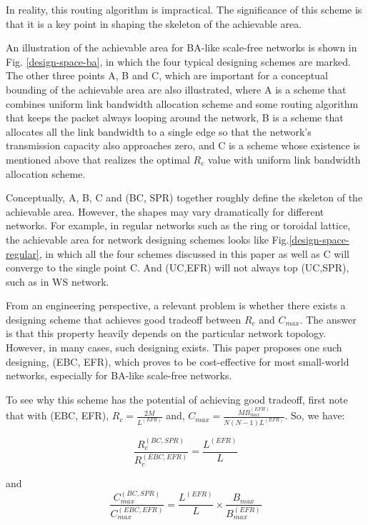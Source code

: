 \documentclass[journal]{IEEEtran}
\begin{document}
{In reality, this routing algorithm is impractical. The significance
of this scheme is that it is a key point in shaping the skeleton of
the achievable area.

An illustration of the achievable area  for BA-like scale-free
networks is shown in Fig. \ref{design-space-ba}, in which the four
typical designing schemes are marked. The other three points A, B
and C, which are important for a conceptual bounding of the
achievable area are also illustrated, where A is a scheme that
combines uniform link bandwidth allocation scheme and some routing
algorithm that keeps the packet always looping around the network, B
is a scheme that allocates all the link bandwidth to a single edge
so that the network's transmission capacity also approaches zero,
and C is a scheme whose existence is mentioned above that realizes
the optimal $R_c$ value with uniform link bandwidth allocation
scheme.

Conceptually, A, B, C and (BC, SPR) together roughly define the
skeleton of the achievable area. However, the shapes may vary
dramatically for different networks. For example, in regular
networks such as the ring or toroidal lattice, the achievable area
for network designing schemes looks like
Fig.\ref{design-space-regular}, in which all the four schemes
discussed in this paper as well as C will converge to the single
point C. And (UC,EFR) will not always top (UC,SPR), such as in WS
network.


From an engineering perspective, a relevant problem is whether there
exists a designing scheme that achieves good tradeoff between $R_c$
and $C_{max}$. The answer is that this property heavily depends on
the particular network topology. However, in many cases, such
designing exists.  This paper proposes one such designing, (EBC,
EFR), which proves to be cost-effective for most small-world
networks, especially for BA-like scale-free networks.

To see why this scheme has the potential of achieving good tradeoff,
first note that with (EBC, EFR), $R_c=\frac{2M}{L^{(EFR)}}$ and,
$C_{max}=\frac{MB^{(EFR)}_{max}}{N(N-1)L^{(EFR)}}$. So, we have:

\begin{equation*}
\frac{R^{(BC,SPR)}_c}{R^{(EBC,EFR)}_c}=\frac{L^{(EFR)}}{L}
\end{equation*}


and
\begin{equation*}
\frac{C^{(BC,SPR)}_{max}}{C^{(EBC,EFR)}_{max}}=\frac{L^{(EFR)}}{L}\times\frac{B_{max}}{B^{(EFR)}_{max}}
\end{equation*}


}
\end{document}
